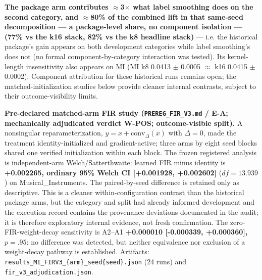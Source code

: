 \textbf{The package arm contributes \ensuremath{\approx}3\ensuremath{\times} what label smoothing does on the second category, and \ensuremath{\approx}80\% of the combined lift in that same-seed decomposition --- a package-level share, no component isolation --- (77\% vs the k16 stack, 82\% vs the k8 headline stack)} --- i.e. the historical package's gain appears on both development categories while label smoothing's does not (no formal component-by-category interaction was tested). Its kernel-length insensitivity also appears on MI (MI k8 0.0413 \ensuremath{\pm} 0.0005 \ensuremath{\approx} k16 0.0415 \ensuremath{\pm} 0.0002). Component attribution for these historical runs remains open; the matched-initialization studies below provide cleaner internal contrasts, subject to their outcome-visibility limits.

\textbf{Pre-declared matched-arm FIR study (\texttt{PREREG\_FIR\_V3.md} / E-A; mechanically adjudicated verdict W-POS; outcome-visible split).} A nonsingular reparameterization, $y=x+\mathrm{conv}_{\Delta}(x)$ with $\Delta=0$, made the treatment identity-initialized and gradient-active; three arms by eight seed blocks shared one verified initialization within each block. The frozen registered analysis is independent-arm Welch/Satterthwaite: learned FIR minus identity is \textbf{+0.002265, ordinary 95\% Welch CI [+0.001928, +0.002602]} ($df=13.939$) on Musical\_Instruments. The paired-by-seed difference is retained only as descriptive. This is a cleaner within-configuration contrast than the historical package arms, but the category and split had already informed development and the execution record contains the provenance deviations documented in the audit; it is therefore exploratory internal evidence, not fresh confirmation. The zero-FIR-weight-decay sensitivity is A2--A1 \textbf{+0.000010 [-0.000339, +0.000360], $p=.95$}: no difference was detected, but neither equivalence nor exclusion of a weight-decay pathway is established. Artifacts: \texttt{results\_MI\_FIRV3\_\{arm\}\_seed\{seed\}.json} (24 runs) and \texttt{fir\_v3\_adjudication.json}.

